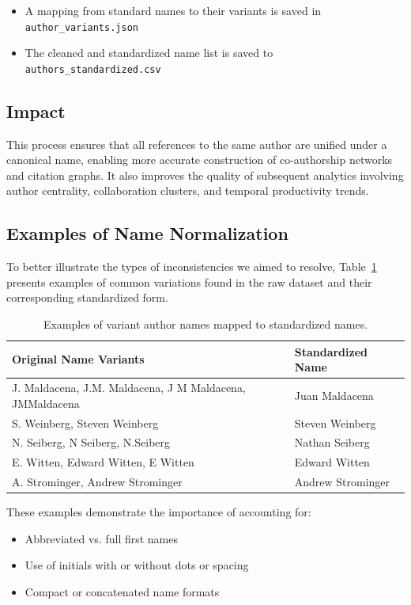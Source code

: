 \documentclass[12pt]{article}
\begin{document}
\begin{itemize}
    \item A mapping from standard names to their variants is saved in \texttt{author\_variants.json}
    \item The cleaned and standardized name list is saved to \texttt{authors\_standardized.csv}
\end{itemize}

\subsection{Impact}

This process ensures that all references to the same author are unified under a canonical name, enabling more accurate construction of co-authorship networks and citation graphs. It also improves the quality of subsequent analytics involving author centrality, collaboration clusters, and temporal productivity trends.

\subsection{Examples of Name Normalization}

To better illustrate the types of inconsistencies we aimed to resolve, Table~\ref{tab:name_variants} presents examples of common variations found in the raw dataset and their corresponding standardized form.

\begin{table}[H]
\centering
\begin{tabular}{|l|l|}
\hline
\textbf{Original Name Variants} & \textbf{Standardized Name} \\
\hline
J. Maldacena, J.M. Maldacena, J M Maldacena, JMMaldacena & Juan Maldacena \\
S. Weinberg, Steven Weinberg & Steven Weinberg \\
N. Seiberg, N Seiberg, N.Seiberg & Nathan Seiberg \\
E. Witten, Edward Witten, E Witten & Edward Witten \\
A. Strominger, Andrew Strominger & Andrew Strominger \\
\hline
\end{tabular}
\caption{Examples of variant author names mapped to standardized names.}
\label{tab:name_variants}
\end{table}

These examples demonstrate the importance of accounting for:
\begin{itemize}
    \item Abbreviated vs. full first names
    \item Use of initials with or without dots or spacing
    \item Compact or concatenated name formats
\end{itemize}
\end{document}
